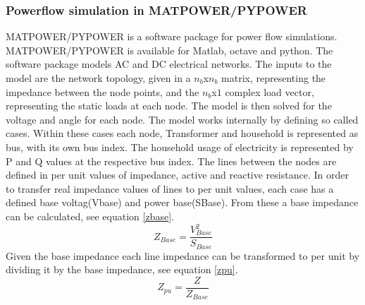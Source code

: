 \documentclass[a4paper]{article}
\begin{document}
\subsubsection{Powerflow simulation in MATPOWER/PYPOWER}
MATPOWER/PYPOWER is a software package for power flow simulations. MATPOWER/PYPOWER is available for Matlab, octave and python. The software package models AC and DC electrical networks. The inputs to the model are the network topology, given in a $n_b$x$n_b$ matrix, representing the impedance between the node points,  and the  $n_b$x$1$ complex load vector, representing the static loads at each node.  The model is then solved for the voltage and angle for each node. The model works internally by defining so called cases. Within these cases each node, Transformer and household is represented as bus, with its own bus index. The household usage of electricity is represented by P and Q values at the respective bus index. The lines between the nodes are defined in per unit values of impedance, active and reactive resistance. In order to transfer real impedance values of lines to per unit values, each case has a defined base voltag(Vbase) and power base(SBase). From these a base impedance can be calculated, see equation \ref{zbase}.\cite{powertransfer}
\begin{equation}
Z_{Base} = \frac{V_{Base}^2}{S_{Base}}
\label{zbase}
\end{equation}
Given the base impedance each line impedance can be transformed to per unit by dividing it by the base impedance, see equation \ref{zpu}.
\begin{equation}
Z_{pu}=\frac{Z}{Z_{Base}}
\label{zpu}
\end{equation}
\end{document}
